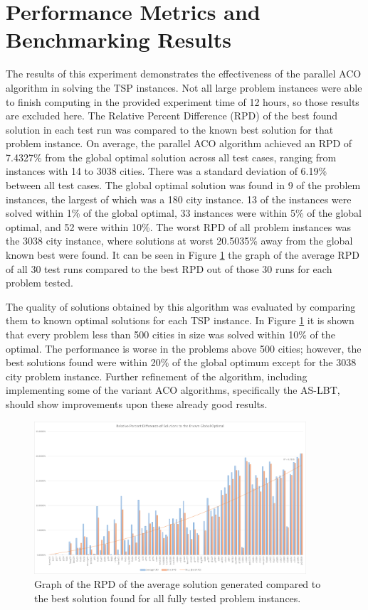 \documentclass[11pt]{report}
\begin{document}
    \section{Performance Metrics and Benchmarking Results}
        The results of this experiment demonstrates the effectiveness of the parallel ACO algorithm in solving the TSP instances. Not all large problem instances were able to finish computing in the provided experiment time of 12 hours, so those results are excluded here. The Relative Percent Difference (RPD) of the best found solution in each test run was compared to the known best solution for that problem instance. On average, the parallel ACO algorithm achieved an RPD of 7.4327\% from the global optimal solution across all test cases, ranging from instances with 14 to 3038 cities. There was a standard deviation of 6.19\% between all test cases. The global optimal solution was found in 9 of the problem instances, the largest of which was a 180 city instance. 13 of the instances were solved within 1\% of the global optimal, 33 instances were within 5\% of the global optimal, and 52 were within 10\%. The worst RPD of all problem instances was the 3038 city instance, where solutions at worst 20.5035\% away from the global known best were found. It can be seen in Figure \ref{fig:rpd} the graph of the average RPD of all 30 test runs compared to the best RPD out of those 30 runs for each problem tested. 

        The quality of solutions obtained by this algorithm was evaluated by comparing them to known optimal solutions for each TSP instance. In Figure \ref{fig:rpd} it is shown that every problem less than 500 cities in size was solved within 10\% of the optimal. The performance is worse in the problems above 500 cities; however, the best solutions found were within 20\% of the global optimum except for the 3038 city problem instance. Further refinement of the algorithm, including implementing some of the variant ACO algorithms, specifically the AS-LBT, should show improvements upon these already good results. 

        \begin{figure}[h]
            \centering
            \includegraphics[width=0.9\textwidth,keepaspectratio]{Images/PRD}
            \caption{Graph of the RPD of the average solution generated compared to the best solution found for all fully tested problem instances.}
            \label{fig:rpd}
        \end{figure}
        \newpage
        
\end{document}
